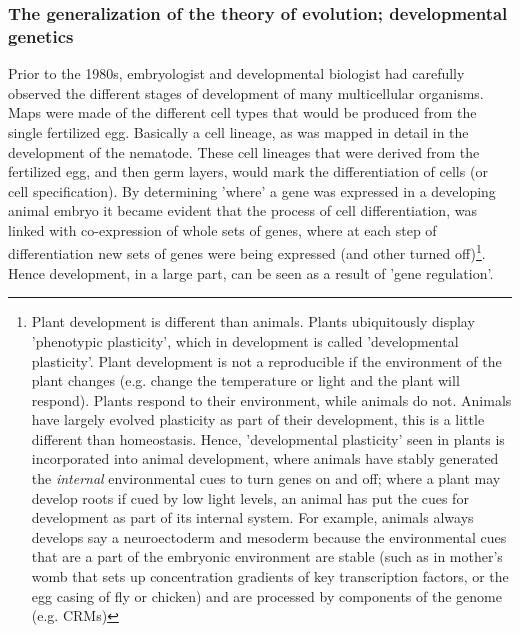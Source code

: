 \subsubsection{The generalization of the theory of evolution; developmental genetics}
Prior to the 1980s, embryologist and developmental biologist had carefully observed the different stages of development of many multicellular organisms.  Maps were made of the different cell types that would be produced from the single fertilized egg.  Basically a cell lineage, as was mapped in detail in the development of the nematode.  These cell lineages that were derived from the fertilized egg, and then germ layers, would mark the differentiation of cells (or cell specification).  By determining 'where' a gene was expressed in a developing animal embryo it became evident that the process of cell differentiation, was linked with co-expression of whole sets of genes, where at each step of differentiation new sets of genes were being expressed (and other turned off)\footnote{Plant development is different than animals.  Plants ubiquitously display 'phenotypic plasticity', which in development is called 'developmental plasticity'.  Plant development is not a reproducible if the environment of the plant changes (e.g. change the temperature or light and the plant will respond).  Plants respond to their environment, while animals do not.  Animals have largely evolved plasticity as part of their development, this is a little different than homeostasis.  Hence, 'developmental plasticity' seen in plants is incorporated into animal development, where animals have stably generated the \textit{internal} environmental cues to turn genes on and off; where a plant may develop roots if cued by low light levels, an animal has put the cues for development as part of its internal system.  For example, animals always develops say a neuroectoderm and mesoderm  because the environmental cues that are a part of the embryonic environment are stable (such as in mother's womb that sets up concentration gradients of key transcription factors, or the egg casing of fly or chicken) and are processed by components of the genome (e.g. CRMs)\cite{ecodevo}}.   Hence development, in a large part, can be seen as a result of 'gene regulation'.
 
